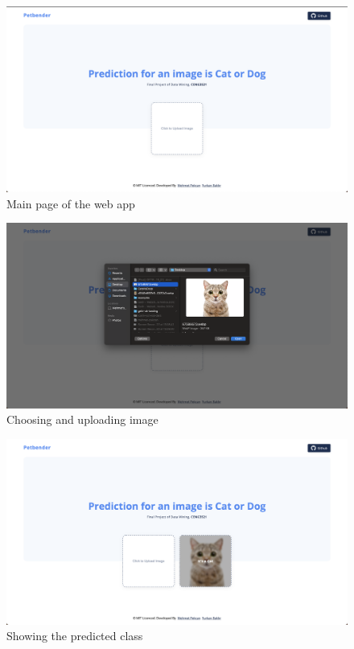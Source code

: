 \documentclass[onecolumn]{article}
\begin{document}
\begin{figure}[H]
\centering
\includegraphics[scale=0.20]{init.png}
\caption{Main page of the web app}
\end{figure}

\begin{figure}[H]
\centering
\includegraphics[scale=0.20]{load.png}
\caption{Choosing and uploading image}
\end{figure}

\begin{figure}[H]
\centering
\includegraphics[scale=0.20]{loaded.png}
\caption{Showing the predicted class}
\end{figure}
\end{document}
